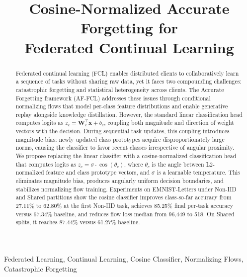 \documentclass[conference]{IEEEtran}
\begin{document}
\title{Cosine-Normalized Accurate Forgetting for\\Federated Continual Learning}

\author{
}

\maketitle

\begin{abstract}
Federated continual learning (FCL) enables distributed clients to collaboratively learn a sequence of tasks without sharing raw data, yet it faces two compounding challenges: catastrophic forgetting and statistical heterogeneity across clients. The Accurate Forgetting framework (AF-FCL) addresses these issues through conditional normalizing flows that model per-class feature distributions and enable generative replay alongside knowledge distillation. However, the standard linear classification head computes logits as $z_c = \mathbf{W}_c^\top \mathbf{x} + b_c$, coupling both magnitude and direction of weight vectors with the decision. During sequential task updates, this coupling introduces magnitude bias: newly updated class prototypes acquire disproportionately large norms, causing the classifier to favor recent classes irrespective of angular proximity. We propose replacing the linear classifier with a cosine-normalized classification head that computes logits as $z_c = \sigma \cdot \cos(\theta_c)$, where $\theta_c$ is the angle between L2-normalized feature and class prototype vectors, and $\sigma$ is a learnable temperature. This eliminates magnitude bias, produces angularly uniform decision boundaries, and stabilizes normalizing flow training. Experiments on EMNIST-Letters under Non-IID and Shared partitions show the cosine classifier improves class-so-far accuracy from 27.11\% to 62.80\% at the first Non-IID task, achieves 85.25\% final per-task accuracy versus 67.34\% baseline, and reduces flow loss median from 96,449 to 518. On Shared splits, it reaches 87.44\% versus 61.27\% baseline.
\end{abstract}

\begin{IEEEkeywords}
Federated Learning, Continual Learning, Cosine Classifier, Normalizing Flows, Catastrophic Forgetting
\end{IEEEkeywords}
\end{document}
